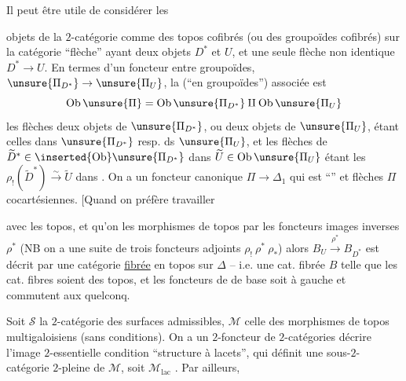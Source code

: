 Il peut être utile de considérer les

objets de la $2$-catégorie comme des topos cofibrés (ou des groupoïdes cofibrés) sur la catégorie ``flèche''
ayant deux objets $D^*$ et $U$, et une seule flèche non identique $D^*\to U$. En termes d'un foncteur entre groupoïdes, $\unsure{\Pi_{D^*}}\to\unsure{\Pi_U}$, la   (``en groupoïdes'') associée \inserted{$\unsure{\Pi}$} est   
\[
\mathrm{Ob}\,\unsure{\Pi}=\mathrm{Ob}\,\unsure{\Pi_{D^*}}\amalg\mathrm{Ob}\,\unsure{\Pi_U}
\]
les flèches   deux objets de $\unsure{\Pi_{D^*}}$, ou deux objets de $\unsure{\Pi_U}$, étant celles dans $\unsure{\Pi_{D^*}}$ resp. ds $\unsure{\Pi_U}$, et les flèches de $\widetilde D^*\in\inserted{\mathrm{Ob}}\unsure{\Pi_{D^*}}$ dans $\widetilde U\in\mathrm{Ob}\,\unsure{\Pi_U}$ étant les  $\rho_!(\widetilde D^*)\xrightarrow{\sim}\widetilde U$ dans .  On a un foncteur canonique $\Pi\to\Delta_1$ qui est ``'' et    flèches  $\Pi$ cocartésiennes. [Quand on préfère travailler

avec les topos, et qu'on  les morphismes \unsure{$\rho$} de topos par les foncteurs images inverses $\rho^*$ (NB on a une suite de trois foncteurs adjoints $\rho_!\ \rho^*\ \rho_*$) alors $B_U\xrightarrow{\rho^*}B_{D^*}$ est décrit par une catégorie  \uline{fibrée} en topos sur $\Delta$ -- i.e. une cat. fibrée $B$ telle que les cat. fibres soient des topos, et les foncteurs de  de base soit  à gauche et commutent aux \unsure{$\underset{\longrightarrow}{\lim}$} quelconq.

Soit $\mathcal S$ la $2$-catégorie des surfaces admissibles, $\mathcal M$ celle des morphismes de topos multigaloisiens (sans conditions). On a un $2$-foncteur de $2$-catégories
 décrire l'image $2$-essentielle  condition ``structure à lacets'',  qui définit une sous-$2$-catégorie $2$-pleine de $\mathcal M$, soit $\mathcal M_{\mathrm{lac}}$ . Par ailleurs,

